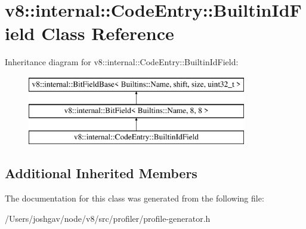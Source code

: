 \hypertarget{classv8_1_1internal_1_1_code_entry_1_1_builtin_id_field}{}\section{v8\+:\+:internal\+:\+:Code\+Entry\+:\+:Builtin\+Id\+Field Class Reference}
\label{classv8_1_1internal_1_1_code_entry_1_1_builtin_id_field}
Inheritance diagram for v8\+:\+:internal\+:\+:Code\+Entry\+:\+:Builtin\+Id\+Field\+:\begin{figure}[H]
\begin{center}
\leavevmode
\includegraphics[height=3.000000cm]{classv8_1_1internal_1_1_code_entry_1_1_builtin_id_field}
\end{center}
\end{figure}
\subsection*{Additional Inherited Members}


The documentation for this class was generated from the following file\+:\begin{DoxyCompactItemize}
\item 
/\+Users/joshgav/node/v8/src/profiler/profile-\/generator.\+h\end{DoxyCompactItemize}
